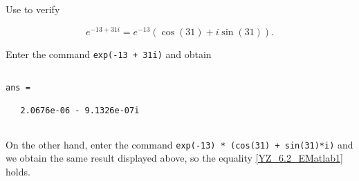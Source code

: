 \documentclass{ximera}
\begin{document}
\begin{computerExercise} \label{YZ_6.2_Matlab1}
Use \Matlab to verify 

\begin{equation}
e^{-13+31i}=e^{-13}(\cos(31)+i\sin(31)). \label{YZ_6.2_EMatlab1}
\end{equation}

\begin{solution}
\soln

Enter the command {\tt exp(-13 + 31i)} and obtain

\begin{verbatim}

ans =

   2.0676e-06 - 9.1326e-07i
   
\end{verbatim}

On the other hand,  enter the command {\tt exp(-13) * (cos(31) + sin(31)*i)} and we obtain the same result displayed above, so the equality \eqref{YZ_6.2_EMatlab1} holds.

\end{solution}

\end{computerExercise}
\end{document}
